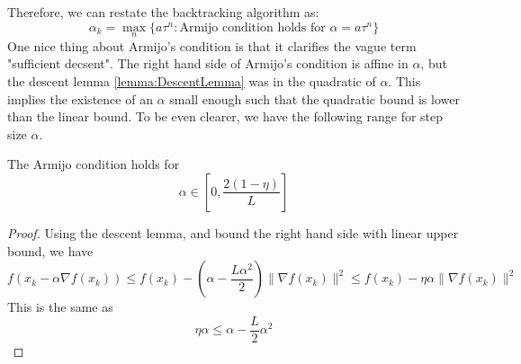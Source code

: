 Therefore, we can restate the backtracking algorithm as:
\begin{equation*}
    \alpha_k = \max_n \{ a\tau^n : \text{Armijo condition holds for }\alpha = a\tau^n \}
\end{equation*}
One nice thing about Armijo's condition is that it clarifies the vague term "sufficient decsent". The right hand side of Armijo's condition is affine in $\alpha$, but the descent lemma \ref{lemma:DescentLemma} was in the quadratic of $\alpha$. This implies the existence of an $\alpha$ small enough such that the quadratic bound is lower than the linear bound. To be even clearer, we have the following range for step size $\alpha$.

\begin{lemma}\label{lemma:ArmijoStepSizeBound}
    The Armijo condition holds for 
    \begin{equation*}
        \alpha \in [0, \frac{2(1 - \eta)}{L}]
    \end{equation*}
\end{lemma}
\begin{proof}
    Using the descent lemma, and bound the right hand side with linear upper bound, we have
    \begin{equation*}
        f(x_k - \alpha \nabla f(x_k)) \leq f(x_k) - (\alpha - \frac{L\alpha^2}{2})\|\nabla f(x_k)\|^2 \leq f(x_k) - \eta\alpha\|\nabla f(x_k) \|^2
    \end{equation*}
    This is the same as
    \begin{equation*}
        \eta\alpha \leq \alpha - \frac{L}{2}\alpha^2
    \end{equation*}
\end{proof}

